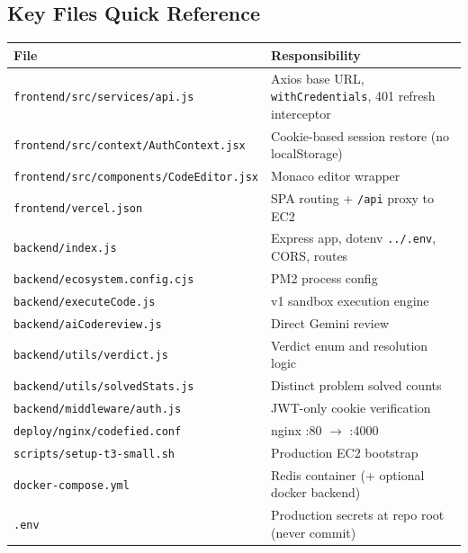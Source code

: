 \documentclass[11pt,a4paper]{article}
\begin{document}
\subsection{Key Files Quick Reference}
\begin{table}[h]
\centering
\small
\begin{tabular}{@{}lp{7.5cm}@{}}
\toprule
\textbf{File} & \textbf{Responsibility} \\
\midrule
\texttt{frontend/src/services/api.js} & Axios base URL, \texttt{withCredentials}, 401 refresh interceptor \\
\texttt{frontend/src/context/AuthContext.jsx} & Cookie-based session restore (no localStorage) \\
\texttt{frontend/src/components/CodeEditor.jsx} & Monaco editor wrapper \\
\texttt{frontend/vercel.json} & SPA routing + \texttt{/api} proxy to EC2 \\
\texttt{backend/index.js} & Express app, dotenv \texttt{../.env}, CORS, routes \\
\texttt{backend/ecosystem.config.cjs} & PM2 process config \\
\texttt{backend/executeCode.js} & v1 sandbox execution engine \\
\texttt{backend/aiCodereview.js} & Direct Gemini review \\
\texttt{backend/utils/verdict.js} & Verdict enum and resolution logic \\
\texttt{backend/utils/solvedStats.js} & Distinct problem solved counts \\
\texttt{backend/middleware/auth.js} & JWT-only cookie verification \\
\texttt{deploy/nginx/codefied.conf} & nginx :80 $\rightarrow$ :4000 \\
\texttt{scripts/setup-t3-small.sh} & Production EC2 bootstrap \\
\texttt{docker-compose.yml} & Redis container (+ optional docker backend) \\
\texttt{.env} & Production secrets at repo root (never commit) \\
\bottomrule
\end{tabular}
\end{table}
\end{document}
